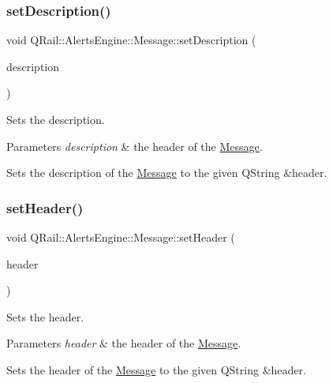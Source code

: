 \subsubsection{\texorpdfstring{setDescription()}{setDescription()}}
{\footnotesize\ttfamily void Q\+Rail\+::\+Alerts\+Engine\+::\+Message\+::set\+Description (\begin{DoxyParamCaption}\item[{const Q\+String \&}]{description }\end{DoxyParamCaption})}



Sets the description. 


\begin{DoxyParams}{Parameters}
{\em description} & the header of the \mbox{\hyperlink{classQRail_1_1AlertsEngine_1_1Message}{Message}}.\\
\hline
\end{DoxyParams}
Sets the description of the \mbox{\hyperlink{classQRail_1_1AlertsEngine_1_1Message}{Message}} to the given Q\+String \&header. \mbox{\label{classQRail_1_1AlertsEngine_1_1Message_af952ee41f2bd04126b5c73aa20c8fccc}} 
\subsubsection{\texorpdfstring{setHeader()}{setHeader()}}
{\footnotesize\ttfamily void Q\+Rail\+::\+Alerts\+Engine\+::\+Message\+::set\+Header (\begin{DoxyParamCaption}\item[{const Q\+String \&}]{header }\end{DoxyParamCaption})}



Sets the header. 


\begin{DoxyParams}{Parameters}
{\em header} & the header of the \mbox{\hyperlink{classQRail_1_1AlertsEngine_1_1Message}{Message}}.\\
\hline
\end{DoxyParams}
Sets the header of the \mbox{\hyperlink{classQRail_1_1AlertsEngine_1_1Message}{Message}} to the given Q\+String \&header. \mbox{\label{classQRail_1_1AlertsEngine_1_1Message_a737ca83ba775f3c836cff2530ff2449d}} 
